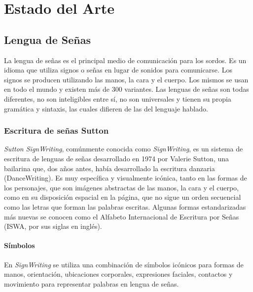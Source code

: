 \chapter{Estado del Arte}\label{chapter:state-of-the-art}

\section{Lengua de Señas}\label{section:state-of-the-art:sl}
La lengua de señas es el principal medio de comunicación para los sordos. Es un idioma que utiliza signos o señas en lugar de sonidos para comunicarse. Los signos se producen utilizando las manos, la cara y el cuerpo. Los mismos se usan en todo el mundo y existen más de 300 variantes.
Las lenguas de señas son todas diferentes, no son inteligibles entre sí, no son universales y tienen su propia gramática y sintaxis, las cuales difieren de las del lenguaje hablado.

\subsection{Escritura de señas Sutton}\label{subsection:state-of-the-art:sw}
\textit{Sutton SignWriting}, comúnmente conocida como \textit{SignWriting}, es un sistema de escritura de lenguas de señas desarrollado en 1974 por Valerie Sutton, una bailarina que, dos años antes, había desarrollado la escritura danzaria (DanceWriting). Es muy específica y visualmente icónica, tanto en las formas de los personajes, que son imágenes abstractas de las manos, la cara y el cuerpo, como en su disposición espacial en la página, que no sigue un orden secuencial como las letras que forman las palabras escritas. Algunas formas estandarizadas más nuevas se conocen como el Alfabeto Internacional de Escritura por Señas (ISWA, por sus siglas en inglés).

\subsubsection{Símbolos}\label{subsubsection:state-of-the-art:sl:symbols}

En \textit{SignWriting} se utiliza una combinación de símbolos icónicos para formas de manos, orientación, ubicaciones corporales, expresiones faciales, contactos y movimiento para representar palabras en lengua de señas.



